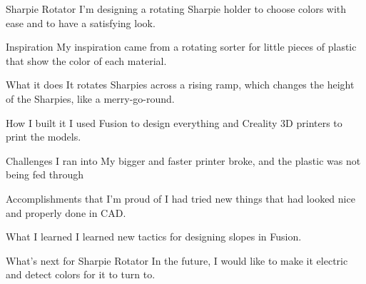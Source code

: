 Sharpie Rotator
I'm designing a rotating Sharpie holder to choose colors with ease and to have a satisfying look.

Inspiration
My inspiration came from a rotating sorter for little pieces of plastic that show the color of each material.

What it does
It rotates Sharpies across a rising ramp, which changes the height of the Sharpies, like a merry-go-round.

How I built it
I used Fusion to design everything and Creality 3D printers to print the models.

Challenges I ran into
My bigger and faster printer broke, and the plastic was not being fed through

Accomplishments that I'm proud of
I had tried new things that had looked nice and properly done in CAD.

What I learned
I learned new tactics for designing slopes in Fusion.

What's next for Sharpie Rotator
In the future, I would like to make it electric and detect colors for it to turn to.
